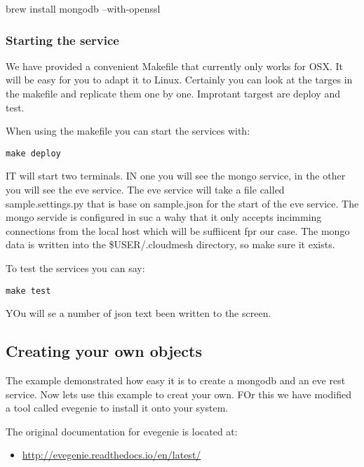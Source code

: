 brew install mongodb --with-openssl

\subsubsection{Starting the service}\label{starting-the-service}

We have provided a convenient Makefile that currently only works for
OSX. It will be easy for you to adapt it to Linux. Certainly you can
look at the targes in the makefile and replicate them one by one.
Improtant targest are deploy and test.

When using the makefile you can start the services with:

\begin{verbatim}
make deploy
\end{verbatim}

IT will start two terminals. IN one you will see the mongo service, in
the other you will see the eve service. The eve service will take a file
called sample.settings.py that is base on sample.json for the start of
the eve service. The mongo servide is configured in suc a wahy that it
only accepts incimming connections from the local host which will be
suffiicent fpr our case. The mongo data is written into the
\$USER/.cloudmesh directory, so make sure it exists.

To test the services you can say:

\begin{verbatim}
make test
\end{verbatim}

YOu will se a number of json text been written to the screen.

\subsection{Creating your own objects}\label{creating-your-own-objects}

The example demonstrated how easy it is to create a mongodb and an eve
rest service. Now lets use this example to creat your own. FOr this we
have modified a tool called evegenie to install it onto your system.

The original documentation for evegenie is located at:

\begin{itemize}

\item
  \url{http://evegenie.readthedocs.io/en/latest/}
\end{itemize}


